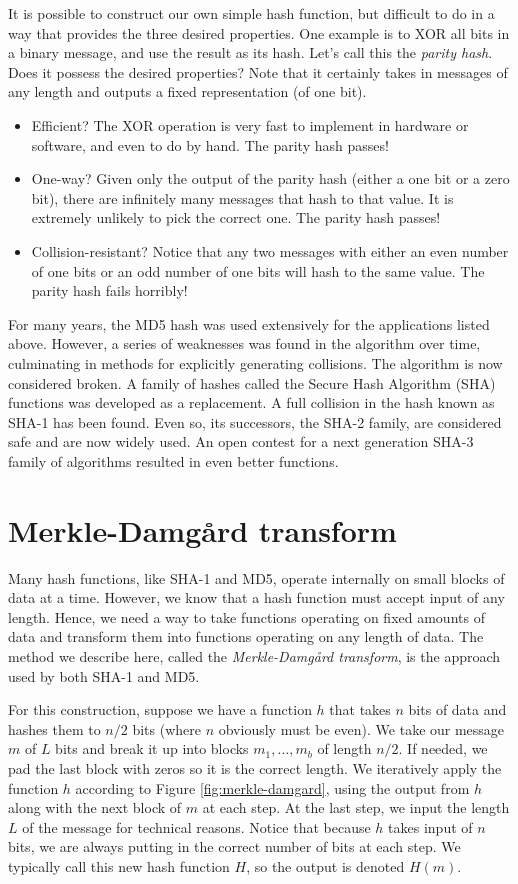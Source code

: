 \documentclass{book}
\theoremstyle{plain}
\theoremstyle{definition}
\begin{document}
It is possible to construct our own simple hash function, but difficult to do in a way that provides the three desired properties. One example is to XOR all bits in a binary message, and use the result as its hash. Let's call this the {\it parity hash}. Does it possess the desired properties? Note that it certainly takes in messages of any length and outputs a fixed representation (of one bit).
\begin{itemize}
\item{Efficient?} The XOR operation is very fast to implement in hardware or software, and even to do by hand. The parity hash passes!
\item{One-way?} Given only the output of the parity hash (either a one bit or a zero bit), there are infinitely many messages that hash to that value. It is extremely unlikely to pick the correct one. The parity hash passes!
\item{Collision-resistant?} Notice that any two messages with either an even number of one bits or an odd number of one bits will hash to the same value. The parity hash fails horribly!
\end{itemize}

For many years, the MD5 hash was used extensively for the applications listed above. However, a series of weaknesses was found in the algorithm over time, culminating in methods for explicitly generating collisions. The algorithm is now considered broken. A family of hashes called the Secure Hash Algorithm (SHA) functions was developed as a replacement. A full collision in the hash known as SHA-1 has been found. Even so, its successors, the SHA-2 family, are considered safe and are now widely used. An open contest for a next generation SHA-3 family of algorithms resulted in even better functions.

\section{Merkle-Damg\r{a}rd transform}
Many hash functions, like SHA-1 and MD5, operate internally on small blocks of data at a time. However, we know that a hash function must accept input of any length. Hence, we need a way to take functions operating on fixed amounts of data and transform them into functions operating on any length of data. The method we describe here, called the {\it Merkle-Damg\r{a}rd transform}, is the approach used by both SHA-1 and MD5.

For this construction, suppose we have a function $h$ that takes $n$ bits of data and hashes them to $n/2$ bits (where $n$ obviously must be even). We take our message $m$ of $L$ bits and break it up into blocks $m_1,\ldots,m_b$ of length $n/2$. If needed, we pad the last block with zeros so it is the correct length. We iteratively apply the function $h$ according to Figure \ref{fig:merkle-damgard}, using the output from $h$ along with the next block of $m$ at each step. At the last step, we input the length $L$ of the message for technical reasons. Notice that because $h$ takes input of $n$ bits, we are always putting in the correct number of bits at each step. We typically call this new hash function $H$, so the output is denoted $H(m)$.
\end{document}
